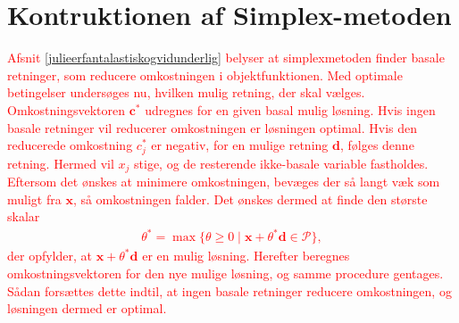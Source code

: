 \section{Kontruktionen af Simplex-metoden}
%
\textcolor{red}{
Afsnit \ref{julieerfantalastiskogvidunderlig} belyser at simplexmetoden finder basale retninger, som reducere omkostningen i objektfunktionen. 
Med optimale betingelser undersøges nu, hvilken mulig retning, der skal vælges. 
Omkostningsvektoren $\mathbf{c}^*$ udregnes for en given basal mulig løsning. 
Hvis ingen basale retninger vil reducerer omkostningen  er løsningen optimal. 
Hvis den reducerede omkostning $c^*_j$ er negativ, for en mulige retning $\mathbf{d}$, følges denne retning. 
Hermed vil $x_j$ stige, og de resterende ikke-basale variable fastholdes.
Eftersom det ønskes at minimere omkostningen, bevæges der så langt væk som muligt fra $\mathbf{x}$, så omkostningen falder.
Det ønskes dermed at finde den største skalar
\begin{align*}
\theta^* = \max \{ \theta \geq 0 \mid \textbf{x} + \theta^*\textbf{d} \in \mathcal{P} \},
\end{align*}
%
der opfylder, at $\mathbf{x} + \theta^* \mathbf{d}$ er en mulig løsning.
Herefter beregnes omkostningsvektoren for den nye mulige løsning, og samme procedure gentages. Sådan forsættes dette indtil, at ingen basale retninger reducere omkostningen, og løsningen dermed er optimal.
%
}
%
%
%	
%	
%	
%	
%